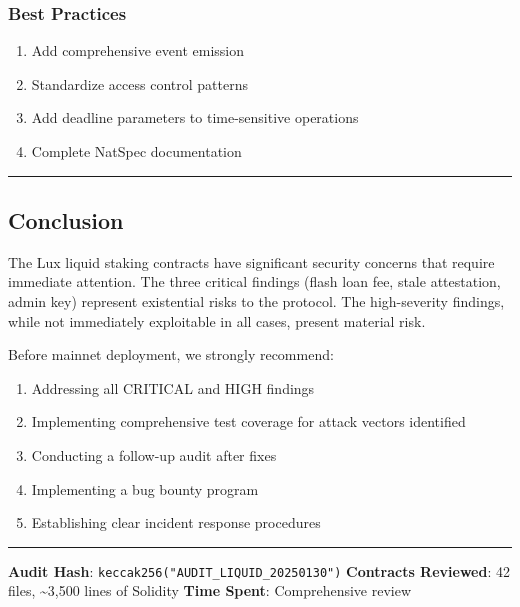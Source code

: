 \documentclass[
]{article}
\providecommand{\tightlist}{%
  \setlength{\itemsep}{0pt}\setlength{\parskip}{0pt}}
\begin{document}
\subsubsection{Best Practices}\label{best-practices}

\begin{enumerate}
\def\labelenumi{\arabic{enumi}.}
\setcounter{enumi}{12}
\tightlist
\item
  Add comprehensive event emission
\item
  Standardize access control patterns
\item
  Add deadline parameters to time-sensitive operations
\item
  Complete NatSpec documentation
\end{enumerate}

\begin{center}\rule{0.5\linewidth}{0.5pt}\end{center}

\subsection{Conclusion}\label{conclusion}

The Lux liquid staking contracts have significant security concerns that
require immediate attention. The three critical findings (flash loan
fee, stale attestation, admin key) represent existential risks to the
protocol. The high-severity findings, while not immediately exploitable
in all cases, present material risk.

Before mainnet deployment, we strongly recommend:

\begin{enumerate}
\def\labelenumi{\arabic{enumi}.}
\tightlist
\item
  Addressing all CRITICAL and HIGH findings
\item
  Implementing comprehensive test coverage for attack vectors identified
\item
  Conducting a follow-up audit after fixes
\item
  Implementing a bug bounty program
\item
  Establishing clear incident response procedures
\end{enumerate}

\begin{center}\rule{0.5\linewidth}{0.5pt}\end{center}

\textbf{Audit Hash}: \texttt{keccak256("AUDIT\_LIQUID\_20250130")}
\textbf{Contracts Reviewed}: 42 files, \textasciitilde3,500 lines of
Solidity \textbf{Time Spent}: Comprehensive review
\end{document}
